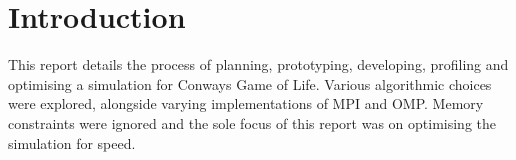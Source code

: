 
\section{Introduction}\label{sec:intro}
This report details the process of planning, prototyping, developing, profiling and optimising a simulation for Conways
Game of Life.
Various algorithmic choices were explored, alongside varying implementations of MPI and OMP.
Memory constraints were ignored and the sole focus of this report was on optimising the simulation for speed.